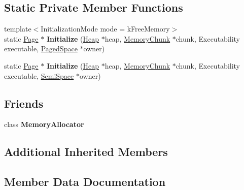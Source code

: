 \subsection*{Static Private Member Functions}
\begin{DoxyCompactItemize}
\item 
{\footnotesize template$<$Initialization\+Mode mode = k\+Free\+Memory$>$ }\\static \hyperlink{classv8_1_1internal_1_1_page}{Page} $\ast$ {\bfseries Initialize} (\hyperlink{classv8_1_1internal_1_1_heap}{Heap} $\ast$heap, \hyperlink{classv8_1_1internal_1_1_memory_chunk}{Memory\+Chunk} $\ast$chunk, Executability executable, \hyperlink{classv8_1_1internal_1_1_paged_space}{Paged\+Space} $\ast$owner)\hypertarget{classv8_1_1internal_1_1_page_af29490421aeef6de6e527a672d59477d}{}\label{classv8_1_1internal_1_1_page_af29490421aeef6de6e527a672d59477d}

\item 
static \hyperlink{classv8_1_1internal_1_1_page}{Page} $\ast$ {\bfseries Initialize} (\hyperlink{classv8_1_1internal_1_1_heap}{Heap} $\ast$heap, \hyperlink{classv8_1_1internal_1_1_memory_chunk}{Memory\+Chunk} $\ast$chunk, Executability executable, \hyperlink{classv8_1_1internal_1_1_semi_space}{Semi\+Space} $\ast$owner)\hypertarget{classv8_1_1internal_1_1_page_a9a0ba42033b1d11c7466a7ae3b6b19b3}{}\label{classv8_1_1internal_1_1_page_a9a0ba42033b1d11c7466a7ae3b6b19b3}

\end{DoxyCompactItemize}
\subsection*{Friends}
\begin{DoxyCompactItemize}
\item 
class {\bfseries Memory\+Allocator}\hypertarget{classv8_1_1internal_1_1_page_aea1126d5a764b0d074d2d6edb5a09f23}{}\label{classv8_1_1internal_1_1_page_aea1126d5a764b0d074d2d6edb5a09f23}

\end{DoxyCompactItemize}
\subsection*{Additional Inherited Members}


\subsection{Member Data Documentation}
